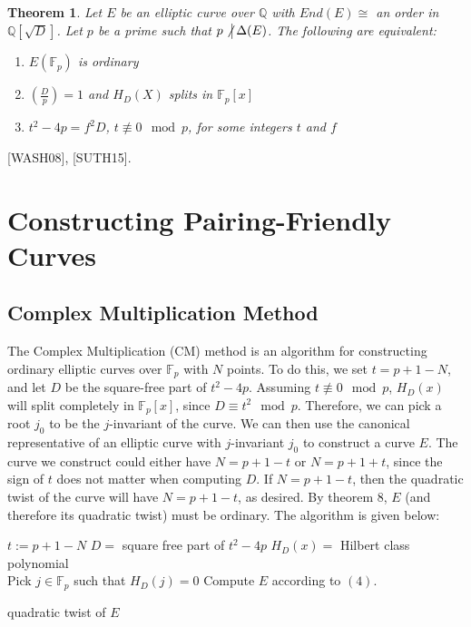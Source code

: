 \documentclass[12pt,twoside]{article}
\newcommand{\legendre}[2]{\genfrac{(}{)}{}{}{#1}{#2}}
\newtheorem{theorem}{Theorem}
\begin{document}
\begin{theorem}
Let $E$ be an elliptic curve over $\mathbb Q$ with $End(E) \cong $ an order in $\mathbb Q[\sqrt D]$. Let $p$ be a prime such that $p \not \big | \, \Delta(E)$. The following are equivalent:
\begin{enumerate} 
\item $E(\mathbb F_p)$ is ordinary
\item $\legendre{D}{p} = 1$ and $H_D(X)$ splits in $\mathbb F_p[x]$
\item $t^2 - 4p = f^2 D$, $t \not \equiv 0 \mod p$, for some integers $t$ and $f$
\end{enumerate}
\end{theorem}
[WASH08], [SUTH15].


\section{Constructing Pairing-Friendly Curves} 

\subsection{Complex Multiplication Method} 

The Complex Multiplication (CM) method is an algorithm for constructing ordinary elliptic curves over $\mathbb F_p$ with $N$ points. To do this, we set $t = p+1 - N$, and let $D$ be the square-free part of $t^2-4p$. Assuming $t \not \equiv 0 \mod p$, $H_{D}(x)$ will split completely in $\mathbb F_p[x]$, since $D \equiv t^2 \mod p$. Therefore, we can pick a root $j_0$ to be the $j$-invariant of the curve. We can then use the canonical representative of an elliptic curve with $j$-invariant $j_0$ to construct a curve $E$. The curve we construct could either have $N = p+1 - t$ or $N= p+1 + t$, since the sign of $t$ does not matter when computing $D$. If $N = p+1 -t$, then the quadratic twist of the curve will have $N = p+1 -t$, as desired. By theorem 8, $E$ (and therefore its quadratic twist) must be ordinary. The algorithm is given below:

\begin{algorithm}[H]
 $t := p+1 - N$\; 
 $D = $ square free part of $t^2-4p$\;
 $H_D(x) = $ Hilbert class polynomial \\
 Pick $j \in \mathbb F_p$ such that $H_D(j) = 0$
 Compute $E$ according to $(4)$.
 
  {
 }
 {\Return quadratic twist of $E$}
 \end{algorithm}
 \bigskip
 
\end{document}
